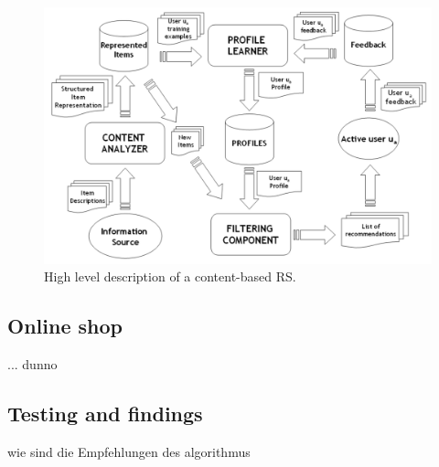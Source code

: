 \begin{figure}[h]
    \center
    \includegraphics[scale=0.3]{inc/implementation/HighlevelContentBased}
    \caption{High level description of a content-based RS.\citep[p.~76]{lops:2011}}
    \label{fig:framework-contentbasedrs}
\end{figure}







\subsection{Online shop}
... dunno

\subsection{Testing and findings}
wie sind die Empfehlungen des algorithmus




